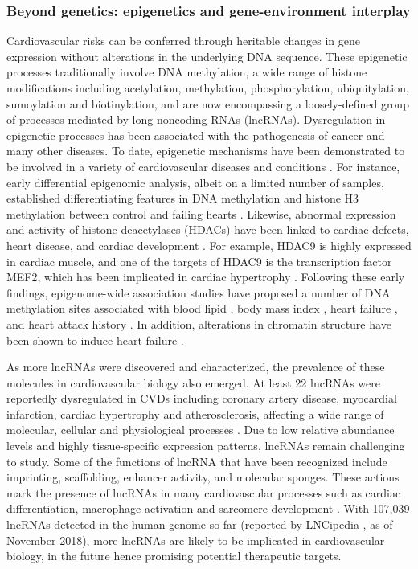 \documentclass[letter]{bib}
\newcounter{example}[subsection]
\begin{document}
\subsubsection*{Beyond genetics: epigenetics and gene-environment interplay}	
	Cardiovascular risks can be conferred through heritable changes in gene expression without alterations in the underlying DNA sequence.  These epigenetic processes traditionally involve DNA methylation, a wide range of histone modifications including acetylation, methylation, phosphorylation, ubiquitylation, sumoylation and biotinylation, and are now encompassing a loosely-defined group of processes mediated by long noncoding RNAs (lncRNAs). Dysregulation in epigenetic processes has been associated with the pathogenesis of cancer and many other diseases. To date, epigenetic mechanisms have been demonstrated to be involved in a variety of cardiovascular diseases and conditions \citep{Udali:2013:Cardiovascular,AbiKhalil:2014:emerging,Muka:2016:role,Gidlof:2016:Ischemic}.
	For instance, early differential epigenomic analysis, albeit on a limited number of samples, established differentiating features in DNA methylation and histone H3 methylation between control and failing hearts \citep{Movassagh:2011:Distinct}.  Likewise, abnormal expression and activity of histone deacetylases (HDACs) have been linked to cardiac defects, heart disease, and cardiac development \citep{Haberland:2009:Many,Trivedi:2007:Hdac2,Chang:2004:Adult,McBurney:2003:Mammalian}.  For example, HDAC9 is highly expressed in cardiac muscle, and one of the targets of HDAC9 is the transcription factor MEF2, which has been implicated in cardiac hypertrophy \citep{Allis:2015:Epigenetics}.  Following these early findings, epigenome-wide association studies have proposed a number of DNA methylation sites associated with blood lipid \citep{Irvin:2014:Epigenomewide}, body mass index \citep{Dick:2014:DNA, Wahl:2017:Epigenomewide}, heart failure \citep{Meder:2017:EpigenomeWide}, and heart attack history \citep{Rask-Andersen:2016:Epigenomewide}. In addition, alterations in chromatin structure have been shown to induce heart failure \citep{Rosa-Garrido:2017:HighResolution}.  
	
	As more lncRNAs were discovered and characterized, the prevalence of these molecules in cardiovascular biology also emerged.
	At least 22 lncRNAs were reportedly dysregulated in CVDs including coronary artery disease, myocardial infarction, cardiac hypertrophy and atherosclerosis, affecting a wide range of molecular, cellular and physiological processes \citep{Das:2018:Deciphering, Xu:2018:Targeting}. Due to low relative abundance levels and highly tissue-specific expression patterns, lncRNAs remain challenging to study.
	Some of the functions of lncRNA that have been recognized include imprinting, scaffolding, enhancer activity, and molecular sponges. These actions mark the presence of lncRNAs in many cardiovascular processes such as cardiac differentiation, macrophage activation and sarcomere development \citep{Sallam:2018:Long}. With 107,039 lncRNAs detected in the human genome so far (reported by LNCipedia \citep{Volders:2018:LNCipedia}, as of November 2018), more lncRNAs are likely to be implicated in cardiovascular biology, in the future hence promising potential therapeutic targets.
\end{document}

